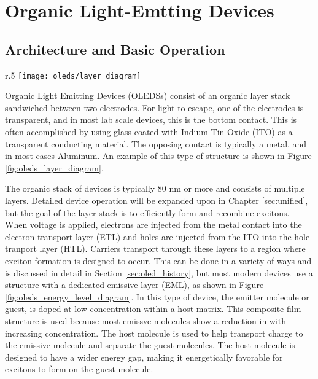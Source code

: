 \documentclass[../thesis.tex]{subfiles}
\begin{document}
\chapter{Organic Light-Emtting Devices}\label{sec:oleds}

\section{Architecture and Basic Operation} \label{sec:oled_operation}

\begin{wrapfigure}{r}{.5\textwidth}
\centering
\texttt{[image: oleds/layer\_diagram]}
\caption{Basic layer diagram for OLED devices.}
\label{fig:oleds_layer_diagram}
\end{wrapfigure}

Organic Light Emitting Devices (OLEDSs) consist of an organic layer stack sandwiched between two electrodes.
For light to escape, one of the electrodes is transparent, and in most lab scale devices, this is the bottom contact.
This is often accomplished by using glass coated with Indium Tin Oxide (ITO) as a transparent conducting material.
The opposing contact is typically a metal, and in most cases Aluminum.
An example of this type of structure is shown in Figure \ref{fig:oleds_layer_diagram}.

The organic stack of devices is typically 80 nm or more and consists of multiple layers.
Detailed device operation will be expanded upon in Chapter \ref{sec:unified}, but the goal of the layer stack is to efficiently form and recombine excitons.
When voltage is applied, electrons are injected from the metal contact into the electron transport layer (ETL) and holes are injected from the ITO into the hole tranport layer (HTL).
Carriers transport through these layers to a region where exciton formation is designed to occur.  
This can be done in a variety of ways and is discussed in detail in Section \ref{sec:oled_history}, but most modern devices use a structure with a dedicated emissive layer (EML), as shown in Figure \ref{fig:oleds_energy_level_diagram}.
In this type of device, the emitter molecule or guest, is doped at low concentration within a host matrix.\supercite{Baldo2000}
This composite film structure is used because most emissve molecules show a reduction in \pl with increasing concentration.\supercite{Turro1991a}
The host molecule is used to help transport charge to the emissive molecule and separate the guest molecules.
The host molecule is designed to have a wider energy gap, making it energetically favorable for excitons to form on the guest molecule.
\end{document}
